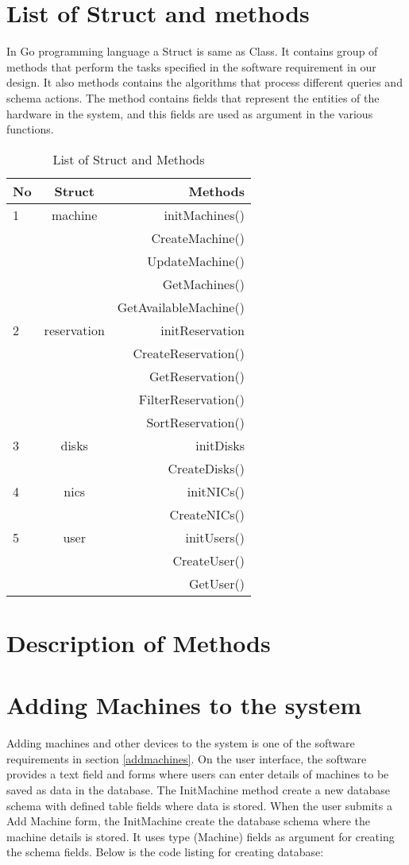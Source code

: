 \section{List of Struct and methods}
In Go programming language a Struct is same as Class. It contains group of methods that perform the tasks specified in the software requirement in our design. It also methods contains the algorithms that process different  queries and schema actions. The method contains fields that represent the entities of the hardware in the system, and this fields are used as argument in the various functions. 
\begin{table}[h!]
  \centering
  \label{tab:table1}
  \begin{tabular}{l|c||r}
    No & Struct& Methods\\
    \hline
    1 &machine &  initMachines()\\
      && CreateMachine()\\
      &&UpdateMachine()\\
      &&GetMachines()\\
      &&GetAvailableMachine()\\
     \hline
    2 &reservation & initReservation\\
    && CreateReservation()\\
    && GetReservation()\\
    && FilterReservation()\\
    && SortReservation()\\
    \hline
    3 &disks & initDisks\\
    && CreateDisks()\\
    \hline
    4 &nics & initNICs()\\
    && CreateNICs()\\
    \hline
    5 &user & initUsers()\\
    && CreateUser()\\
    && GetUser()
  \end{tabular}
  \caption{List of Struct and Methods}
\end{table}

\pagebreak
\section{Description of Methods}
\section*{Adding Machines to the system}
Adding machines and other devices to the system is one of the software requirements in section \ref{addmachines}. On the user interface, the software provides a text field and forms where users can enter details of machines to be saved as data in the database. The InitMachine method create a new database schema with defined table fields where data is stored. When the user submits a Add Machine form, the InitMachine create the database schema where the machine details is stored. It uses type (Machine) fields as argument for creating the schema fields. Below is the code listing for creating database:

